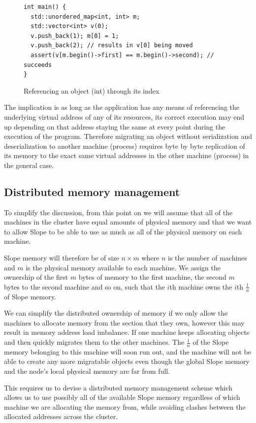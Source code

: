 \begin{figure}[tp]
\begin{lstlisting}
int main() {
  std::unordered_map<int, int> m;
  std::vector<int> v(0);
  v.push_back(1); m[0] = 1;
  v.push_back(2); // results in v[0] being moved
  assert(v[m.begin()->first] == m.begin()->second); // succeeds
}
\end{lstlisting}
\caption{
    Referencing an object (int) through its index
}
\label{fig:refbyindex}
\end{figure}

The implication is as long as the
application has any means of referencing the underlying virtual address of any
of its resources, its correct execution may end up depending on that address
staying the same at every point during the execution of the program. Therefore
migrating an object without serialization and deserialization to another
machine (process)
requires byte by byte replication of its memory to the exact same virtual
addresses in the other machine (process) in the general case.

\subsection{Distributed memory management}
\label{sec:globalmem}
To simplify the discussion, from this point on we will assume that all of the
machines in the cluster have equal amounts of physical memory and that we want
to allow Slope to be able to use as much as all of the physical memory on each
machine.

Slope memory will therefore be of size $n \times m$ where $n$ is the number
of machines and $m$ is the physical memory available to each machine. We assign
the ownership of the first $m$ bytes of memory to the first machine, the
second $m$ bytes to the second machine and so on, such that the $i$th machine
owns the $i$th $\frac{1}{n}$ of Slope memory.

We can simplify the distributed ownership of memory if we only allow the
machines to allocate memory from the section that they own, however this may
result in memory address load imbalance. If one machine keeps
allocating objects and then quickly migrates them to the other machines. The
$\frac{1}{n}$ of the Slope memory belonging to this machine will soon run out,
and the machine will not be able to create any more migratable objects
even though the global Slope memory and the node's local physical memory are
far from full.

This requires us to devise a distributed memory management scheme which allows
us to use possibly all of the available Slope memory regardless of which
machine we are allocating the memory from, while avoiding clashes
between the allocated addresses across the cluster.


